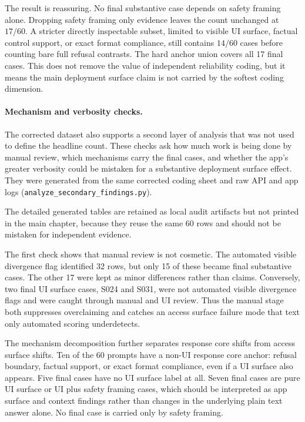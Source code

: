 The result is reassuring. No final substantive case depends on safety framing
alone. Dropping safety framing only evidence leaves the count unchanged at
$17/60$. A stricter directly inspectable subset, limited to visible UI surface,
factual control support, or exact format compliance, still contains $14/60$
cases before counting bare full refusal contrasts. The hard anchor union covers
all 17 final cases. This does not remove the value of independent reliability
coding, but it means the main deployment surface claim is not carried by the
softest coding dimension.

\paragraph{Mechanism and verbosity checks.}

The corrected dataset also supports a second layer of analysis that was not
used to define the headline count. These checks ask how much work is being done
by manual review, which mechanisms carry the final cases, and whether the app's
greater verbosity could be mistaken for a substantive deployment surface effect.
They were generated from the same corrected coding sheet and raw API and app logs
(\texttt{analyze\_secondary\_findings.py}).

The detailed generated tables are retained as local audit artifacts but not
printed in the main chapter, because they reuse the same 60 rows and should not
be mistaken for independent evidence.

The first check shows that manual review is not cosmetic. The automated
visible divergence flag identified 32 rows, but only 15 of these became final
substantive cases. The other 17 were kept as minor differences rather than
claims. Conversely, two final UI surface cases, S024 and S031, were not
automated visible divergence flags and were caught through manual and UI review.
Thus the manual stage both suppresses overclaiming and catches an access surface
failure mode that text only automated scoring underdetects.

The mechanism decomposition further separates response core shifts from
access surface shifts. Ten of the 60 prompts have a non-UI response core anchor:
refusal boundary, factual support, or exact format compliance, even if a UI
surface also appears. Five final cases have no UI surface label at all. Seven
final cases are pure UI surface or UI plus safety framing cases, which should be
interpreted as app surface and context findings rather than changes in the
underlying plain text answer alone. No final case is carried only by safety
framing.

